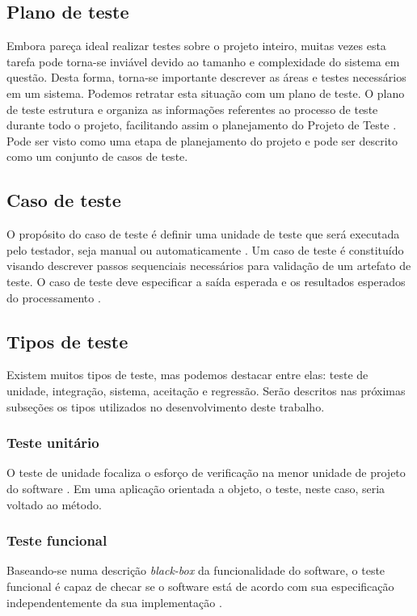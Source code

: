 \documentclass[tg]{mdtufsm}
\begin{document}
\subsection{Plano de teste}
Embora pareça ideal realizar testes sobre o projeto inteiro, muitas vezes esta tarefa pode torna-se inviável devido ao tamanho e complexidade do sistema em questão. Desta forma, torna-se importante descrever as áreas e testes necessários em um sistema. Podemos retratar esta situação com um plano de teste.
O plano de teste estrutura e organiza as informações referentes  ao  processo  de  teste  durante  todo  o  projeto,  facilitando assim  o  planejamento  do  
Projeto  de  Teste \cite{piqueiro2015}. Pode ser visto como uma etapa de planejamento do projeto e pode ser descrito como um conjunto de casos de teste.

\subsection{Caso de teste}
O propósito do caso de teste é definir uma unidade de teste que será executada pelo testador, seja manual ou automaticamente \cite{rios2006teste}. Um caso de teste é constituído visando descrever passos sequenciais necessários para validação de um artefato de teste. O caso de teste deve especificar a saída esperada e os resultados esperados do processamento \cite{myers2011art}.

\subsection{Tipos de teste}
Existem muitos tipos de teste, mas podemos destacar entre elas: teste de unidade, integração, sistema, aceitação e regressão. Serão descritos nas próximas subseções os tipos utilizados no desenvolvimento deste trabalho.

\subsubsection{Teste unitário}
O teste de unidade focaliza o esforço de verificação na menor unidade de projeto do software \cite{pressman2011engenharia}. Em uma aplicação orientada a objeto, o teste, neste caso, seria voltado ao método.

\subsubsection{Teste funcional}
Baseando-se numa descrição \emph{black-box} da funcionalidade do software, o teste funcional é capaz de checar se o software está de acordo com sua especificação independentemente da sua implementação \cite{fantinato2005autotest}.
 
\end{document}
